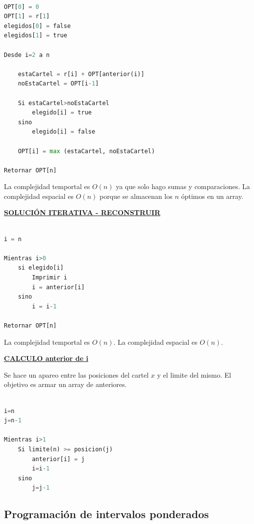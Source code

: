 \documentclass{article}
\begin{document}
\begin{lstlisting}[language=Python, caption=Solución iterativa con reconstrucción]

OPT[0] = 0
OPT[1] = r[1]
elegidos[0] = false
elegidos[1] = true

Desde i=2 a n

    estaCartel = r[i] + OPT[anterior(i)]
    noEstaCartel = OPT[i-1]

    Si estaCartel>noEstaCartel 
        elegido[i] = true
    sino
        elegido[i] = false

    OPT[i] = max (estaCartel, noEstaCartel)

Retornar OPT[n]
\end{lstlisting}


La complejidad temportal es \(O(n)\) ya que solo hago sumas y comparaciones. La complejidad espacial
es \(O(n)\) porque se almacenan los \(n\) óptimos en un array.

\noindent
\textbf{\underline{SOLUCIÓN ITERATIVA - RECONSTRUIR}}

\begin{lstlisting}[language=Python, caption=Solución iterativa]

i = n

Mientras i>0
    si elegido[i]
        Imprimir i
        i = anterior[i]
    sino 
        i = i-1

Retornar OPT[n]
\end{lstlisting}


La complejidad temportal es \(O(n)\). La complejidad espacial es \(O(n)\).



\noindent
\textbf{\underline{CALCULO anterior de i}}


Se hace un apareo entre las posiciones del cartel \(x\) y el limite del mismo. 
El objetivo es armar un array de anteriores.

\begin{lstlisting}[language=Python, caption=Solución iterativa]

i=n
j=n-1

Mientras i>1
    Si limite(n) >= posicion(j)
        anterior[i] = j
        i=i-1
    sino
        j=j-1

\end{lstlisting}


\newpage
\subsection{Programación de intervalos ponderados}
\end{document}
